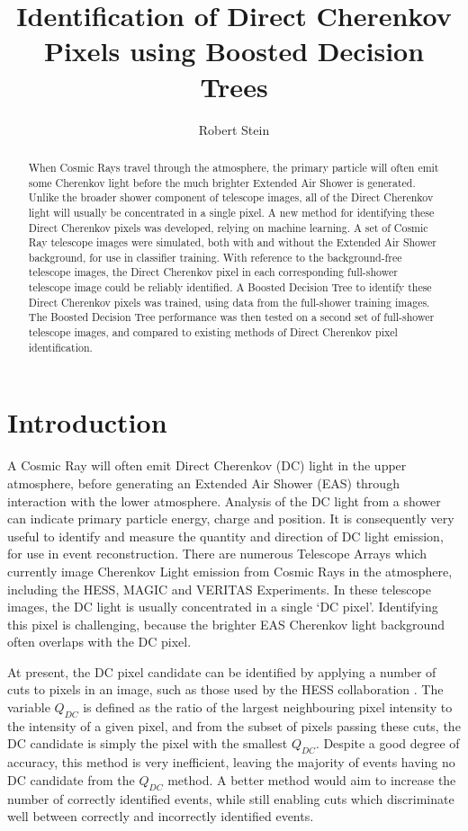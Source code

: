 \documentclass[]{article}
\title{Identification of Direct Cherenkov Pixels using Boosted Decision Trees}
\author{Robert Stein}
\begin{document}
\maketitle

\begin{abstract}
When Cosmic Rays travel through the atmosphere, the primary particle will often emit some Cherenkov light before the much brighter Extended Air Shower is generated. Unlike the broader shower component of telescope images, all of the Direct Cherenkov light will usually be concentrated in a single pixel. A new method for identifying these Direct Cherenkov pixels was developed, relying on machine learning. A set of Cosmic Ray telescope images were simulated, both with and without the Extended Air Shower background, for use in classifier training. With reference to the background-free telescope images, the Direct Cherenkov pixel in each corresponding full-shower telescope image could be reliably identified. A Boosted Decision Tree to identify these Direct Cherenkov pixels was trained, using data from the full-shower training images. The Boosted Decision Tree performance was then tested on a second set of full-shower telescope images, and compared to existing methods of Direct Cherenkov pixel identification.
\end{abstract}

\section{Introduction}
A Cosmic Ray will often emit Direct Cherenkov (DC) light in the upper atmosphere, before generating an Extended Air Shower (EAS) through interaction with the lower atmosphere. Analysis of the DC light from a shower can indicate primary particle energy, charge and position. It is consequently very useful to identify and measure the quantity and direction of DC light emission, for use in event reconstruction. There are numerous Telescope Arrays which currently image Cherenkov Light emission from Cosmic Rays in the atmosphere, including the HESS, MAGIC and VERITAS Experiments. In these telescope images, the DC light is usually concentrated in a single  \textquoteleft DC pixel'. Identifying this pixel is challenging, because the brighter EAS Cherenkov light background often overlaps with the DC pixel. 

At present, the DC pixel candidate can be identified by applying a number of cuts to pixels in an image, such as those used by the HESS collaboration \cite{hess07}. The variable $Q_{DC}$ is defined as the ratio of the largest neighbouring pixel intensity to the intensity of a given pixel, and from the subset of pixels passing these cuts, the DC candidate is simply the pixel with the smallest $Q_{DC}$. Despite a good degree of accuracy, this method is very inefficient, leaving the majority of events having no DC candidate from the $Q_{DC}$ method. A better method would aim to increase the number of correctly identified events, while still enabling cuts which discriminate well between correctly and incorrectly identified events.
\end{document}
